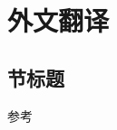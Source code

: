 \cleardoublepage

\newrefsection
\sectionmajornumbering
\chapter{外文翻译}


\section{节标题}


参考~\cite{zjuthesisrules, zjuthesis}

\begingroup
{}
\printbibliography[title={外文翻译参考文献}]
\endgroup
